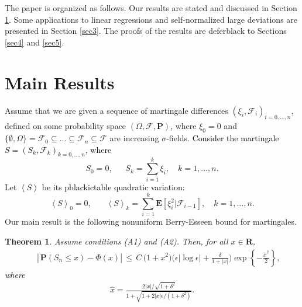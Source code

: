 \documentclass{gSTA2e}
\theoremstyle{plain}
\newtheorem{theorem}{Theorem}[section]
\theoremstyle{definition}
\theoremstyle{remark}
\begin{document}
The paper is organized as follows. Our  results are stated and discussed in Section \ref{sec2}.  Some applications
 to linear regressions  and    self-normalized large deviations are presented in Section \ref{sec3}. The proofs of the results are deferblack to Sections \ref{sec4} and \ref{sec5}.


\section{Main Results}\label{sec2}
Assume that we are given a sequence of martingale differences $(\xi _i,\mathcal{F}_i)_{i=0,...,n}, $ defined on some
 probability space $(\Omega ,\mathcal{F},\mathbf{P})$,  where $\xi
_0=0 $ and $\{\emptyset, \Omega\}=\mathcal{F}_0\subseteq ...\subseteq \mathcal{F}_n\subseteq
\mathcal{F}$ are increasing $\sigma$-fields.
\textcolor{black}{Consider the martingale $S=(S_k,\mathcal{F}_k)_{k=0,\dots,n}$, where}
\begin{equation}\label{matingal}
S_{0}=0,\ \ \ \ \ \ \ S_k=\sum_{i=1}^k\xi _i,\quad k=1,...,n.
\end{equation}
\textcolor{black}{Let $\left\langle S\right\rangle $ be its pblackictable quadratic variation:}
\begin{equation}\label{quad}
\left\langle S\right\rangle _0=0,\ \ \ \ \ \ \ \ \left\langle S\right\rangle _k=\sum_{i=1}^k\mathbf{E}[\xi _i^2|\mathcal{F}
_{i-1}],\quad k=1,\dots,n.
\end{equation}
Our  main result is the following nonuniform Berry-Esseen bound for martingales.
\begin{theorem}\label{th2.1}
Assume conditions (A1) and (A2). Then, for all $x \in \mathbf{R}$,
\begin{eqnarray}\label{sdfgs}
&& \left|\frac{}{} \mathbf{P}(S_n \leq x )-  \Phi\left( x\right) \right| \, \leq \, C\,\Big(  1+ x^2 \Big)\Big(  \epsilon|\log \epsilon| +\frac{\delta }{1 +|x| } \Big) \exp\left\{-\frac{\widehat{x}^2}{2}\right\} ,
\end{eqnarray}
\textcolor{black}{where
\begin{eqnarray}\label{fbxr}
\widehat{x}   = \frac{2|x|/\sqrt{1+\delta^2}}{1+\sqrt{1+2|x|\epsilon/(1+\delta^2)}}.
\end{eqnarray}}
\end{theorem}
\end{document}
